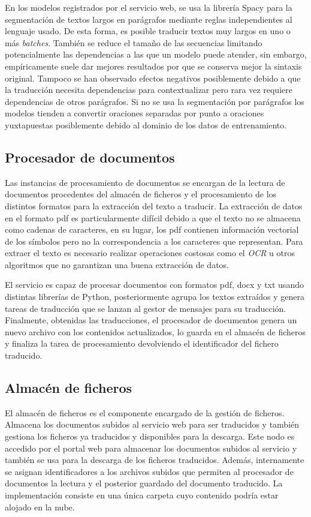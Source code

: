 En los modelos registrados por el servicio web, se usa la librería Spacy para la segmentación de textos largos en parágrafos mediante reglas independientes al lenguaje usado. De esta forma, es posible traducir textos muy largos en uno o más \textit{batches}. También se reduce el tamaño de las secuencias limitando potencialmente las dependencias a las que un modelo puede atender, sin embargo, empíricamente suele dar mejores resultados por que se conserva mejor la sintaxis original. Tampoco se han observado efectos negativos posiblemente debido a que la traducción necesita dependencias para contextualizar pero rara vez requiere dependencias de otros parágrafos. Si no se usa la segmentación por parágrafos los modelos tienden a convertir oraciones separadas por punto a oraciones yuxtapuestas posiblemente debido al dominio de los datos de entrenamiento.

\subsection{Procesador de documentos}
Las instancias de procesamiento de documentos se encargan de la lectura de documentos procedentes del almacén de ficheros y el procesamiento de los distintos formatos para la extracción del texto a traducir. La extracción de datos en el formato pdf es particularmente difícil debido a que el texto no se almacena como cadenas de caracteres, en su lugar, los pdf contienen información vectorial de los símbolos pero no la correspondencia a los caracteres que representan. Para extraer el texto es necesario realizar operaciones costosas como el \textit{OCR} u otros algoritmos que no garantizan una buena extracción de datos.

El servicio es capaz de procesar documentos con formatos pdf, docx y txt usando distintas librerías de Python, posteriormente agrupa los textos extraídos y genera tareas de traducción que se lanzan al gestor de mensajes para su traducción. Finalmente, obtenidas las traducciones, el procesador de documentos genera un nuevo archivo con los contenidos actualizados, lo guarda en el almacén de ficheros y finaliza la tarea de procesamiento devolviendo el identificador del fichero traducido.

\subsection{Almacén de ficheros}
El almacén de ficheros es el componente encargado de la gestión de ficheros. Almacena los documentos subidos al servicio web para ser traducidos y también gestiona los ficheros ya traducidos y disponibles para la descarga.
Este nodo es accedido por el portal web para almacenar los documentos subidos al servicio y también se usa para la descarga de los ficheros traducidos. Además, internamente se asignan identificadores a los archivos subidos que permiten al procesador de documentos la lectura y el posterior guardado del documento traducido.
La implementación consiste en una única carpeta cuyo contenido podría estar alojado en la nube.

